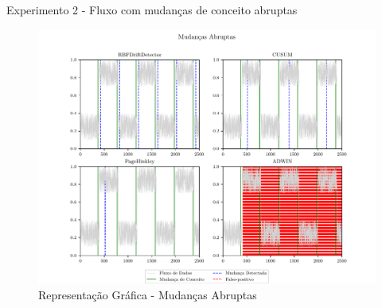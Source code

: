 \documentclass[10pt]{beamer}
\begin{document}
\begin{frame}{Experimento 2 - Fluxo com mudanças de conceito abruptas}
    \begin{figure}[H]
        \begin{center}
            \includegraphics[scale=0.45]{../text/imagens/abrupt.pdf}
            \caption{Representação Gráfica - Mudanças Abruptas}
            \label{fig:exp_abrupta}
        \end{center}
    \end{figure}
\end{frame}
\end{document}

